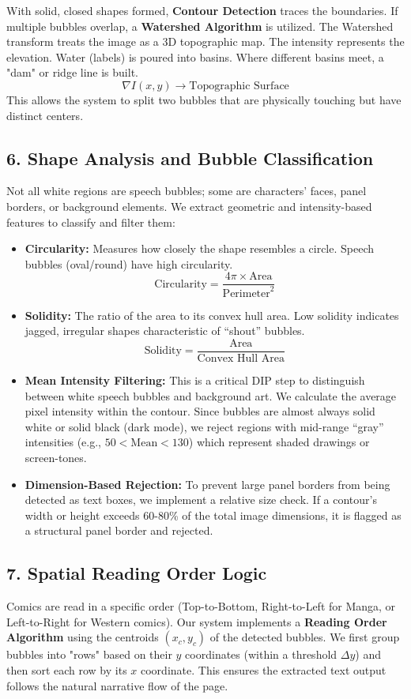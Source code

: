 \documentclass{article}
\begin{document}
With solid, closed shapes formed, \textbf{Contour Detection} traces the boundaries. If multiple bubbles overlap, a \textbf{Watershed Algorithm} is utilized. 
The Watershed transform treats the image as a 3D topographic map. The intensity represents the elevation. Water (labels) is poured into basins. Where different basins meet, a "dam" or ridge line is built. 
\[
\nabla I(x,y) \rightarrow \text{Topographic Surface}
\]
This allows the system to split two bubbles that are physically touching but have distinct centers.

\subsection{6. Shape Analysis and Bubble Classification}
Not all white regions are speech bubbles; some are characters' faces, panel borders, or background elements. We extract geometric and intensity-based features to classify and filter them:
\begin{itemize}
    \item \textbf{Circularity:} Measures how closely the shape resembles a circle. Speech bubbles (oval/round) have high circularity.
    \[ \text{Circularity} = \frac{4 \pi \times \text{Area}}{\text{Perimeter}^2} \]
    \item \textbf{Solidity:} The ratio of the area to its convex hull area. Low solidity indicates jagged, irregular shapes characteristic of ``shout'' bubbles.
    \[ \text{Solidity} = \frac{\text{Area}}{\text{Convex Hull Area}} \]
    \item \textbf{Mean Intensity Filtering:} This is a critical DIP step to distinguish between white speech bubbles and background art. We calculate the average pixel intensity within the contour. Since bubbles are almost always solid white or solid black (dark mode), we reject regions with mid-range ``gray'' intensities (e.g., $50 < \text{Mean} < 130$) which represent shaded drawings or screen-tones.
    \item \textbf{Dimension-Based Rejection:} To prevent large panel borders from being detected as text boxes, we implement a relative size check. If a contour's width or height exceeds 60-80\% of the total image dimensions, it is flagged as a structural panel border and rejected.
\end{itemize}

\subsection{7. Spatial Reading Order Logic}
Comics are read in a specific order (Top-to-Bottom, Right-to-Left for Manga, or Left-to-Right for Western comics). Our system implements a \textbf{Reading Order Algorithm} using the centroids $(x_c, y_c)$ of the detected bubbles. We first group bubbles into "rows" based on their $y$ coordinates (within a threshold $\Delta y$) and then sort each row by its $x$ coordinate. This ensures the extracted text output follows the natural narrative flow of the page.
\end{document}
